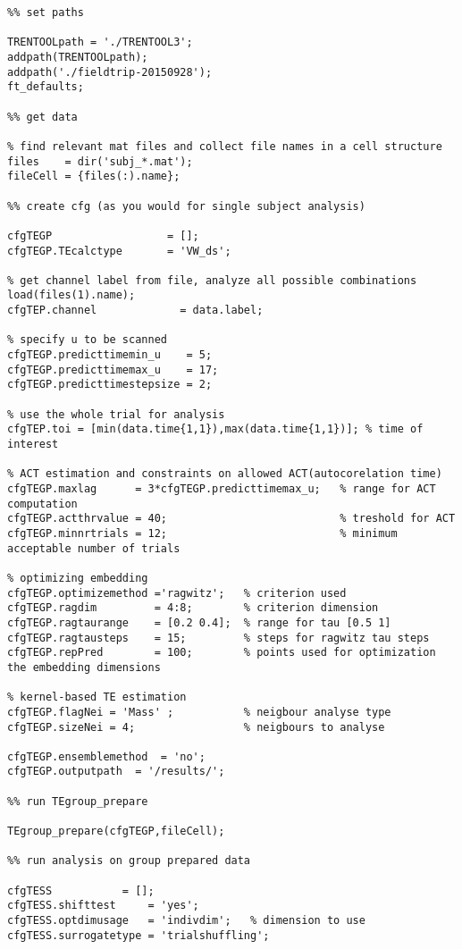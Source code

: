 \begin{lstlisting}
%% set paths

TRENTOOLpath = './TRENTOOL3';
addpath(TRENTOOLpath); 
addpath('./fieldtrip-20150928');
ft_defaults;

%% get data

% find relevant mat files and collect file names in a cell structure
files    = dir('subj_*.mat');
fileCell = {files(:).name};

%% create cfg (as you would for single subject analysis)

cfgTEGP                  = [];
cfgTEGP.TEcalctype       = 'VW_ds'; 

% get channel label from file, analyze all possible combinations
load(files(1).name);
cfgTEP.channel             = data.label;

% specify u to be scanned
cfgTEGP.predicttimemin_u    = 5;
cfgTEGP.predicttimemax_u    = 17;
cfgTEGP.predicttimestepsize = 2;

% use the whole trial for analysis
cfgTEP.toi = [min(data.time{1,1}),max(data.time{1,1})]; % time of interest

% ACT estimation and constraints on allowed ACT(autocorelation time)
cfgTEGP.maxlag      = 3*cfgTEGP.predicttimemax_u;   % range for ACT computation
cfgTEGP.actthrvalue = 40;                           % treshold for ACT 
cfgTEGP.minnrtrials = 12;                           % minimum acceptable number of trials

% optimizing embedding
cfgTEGP.optimizemethod ='ragwitz';   % criterion used
cfgTEGP.ragdim         = 4:8;        % criterion dimension
cfgTEGP.ragtaurange    = [0.2 0.4];  % range for tau [0.5 1]
cfgTEGP.ragtausteps    = 15;         % steps for ragwitz tau steps
cfgTEGP.repPred        = 100;        % points used for optimization the embedding dimensions

% kernel-based TE estimation
cfgTEGP.flagNei = 'Mass' ;           % neigbour analyse type
cfgTEGP.sizeNei = 4;                 % neigbours to analyse

cfgTEGP.ensemblemethod  = 'no';
cfgTEGP.outputpath  = '/results/';

%% run TEgroup_prepare

TEgroup_prepare(cfgTEGP,fileCell);

%% run analysis on group prepared data

cfgTESS		      = [];
cfgTESS.shifttest     = 'yes';
cfgTESS.optdimusage   = 'indivdim';   % dimension to use
cfgTESS.surrogatetype = 'trialshuffling';


\end{lstlisting}
